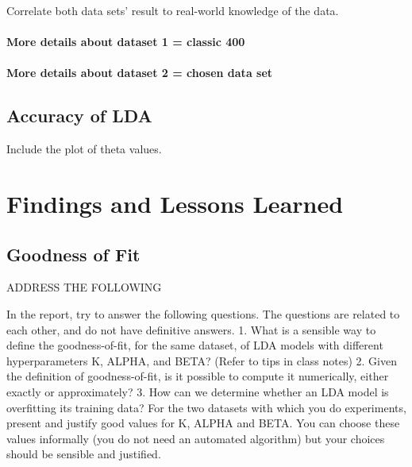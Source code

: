 \documentclass[11pt,a4paper,oneside]{article}
\begin{document}
Correlate both data sets' result to real-world knowledge of the data.

\paragraph{More details about dataset 1 = classic 400}
\paragraph{More details about dataset 2 = chosen data set}

\subsection{Accuracy of LDA}
Include the plot of theta values.

\section{Findings and Lessons Learned}
\label{Lessons}

\subsection{Goodness of Fit}
ADDRESS THE FOLLOWING

In the report, try to answer the following questions. The questions are related to each other, and do not have definitive answers.
1. What is a sensible way to define the goodness-of-fit, for the same dataset, of LDA models with different hyperparameters K, ALPHA, and BETA? (Refer to tips in class notes)
2. Given the definition of goodness-of-fit, is it possible to compute it numerically, either exactly or approximately?
3. How can we determine whether an LDA model is overfitting its training data?
For the two datasets with which you do experiments, present and justify good values for K, ALPHA and BETA. You can choose these values informally (you do not need an automated algorithm) but your choices should be sensible and justified.



\end{document}

